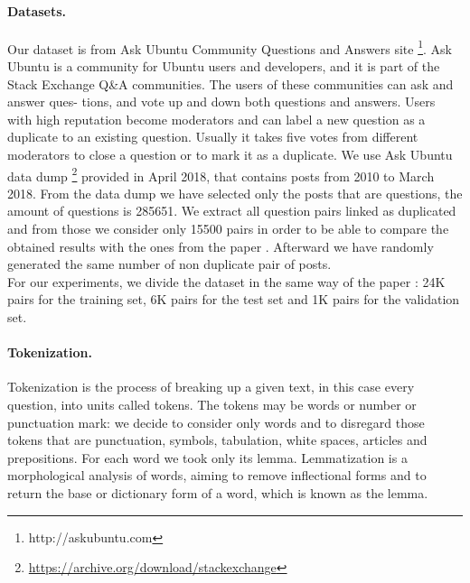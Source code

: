 \documentclass[10pt,twocolumn,letterpaper]{article}
\begin{document}
\paragraph{Datasets.}
Our dataset is from Ask Ubuntu Community Questions and Answers site \footnote{http://askubuntu.com}. Ask Ubuntu is a community for Ubuntu users and developers, and it is part of the Stack Exchange Q\&A communities. The users of these communities can ask and answer ques- tions, and vote up and down both questions and answers. Users with high reputation become moderators and can label a new question as a duplicate to an existing question. Usually it takes five votes from different moderators to close a question or to mark it as a duplicate. 
We use Ask Ubuntu data dump \footnote{ \url{https://archive.org/download/stackexchange}} provided in April 2018, that contains posts from 2010 to March 2018. From the data dump we have selected only the posts that are questions, the amount of questions is 285651. We extract all question pairs linked as duplicated and from those we consider only 15500 pairs in order to be able to compare the obtained results with the ones from the paper \cite{bogdanova2015detecting}. Afterward we have randomly generated the same number of non duplicate pair of posts. \\
For our experiments, we divide the dataset in the same way of the paper \cite{bogdanova2015detecting}: 24K pairs for the training set, 6K pairs for the test set and 1K pairs for the validation set.

\paragraph{Tokenization.}
Tokenization is the process of breaking up a given text, in this case every question, into units called tokens. The tokens may be words or number or punctuation mark: we decide to consider only words and to disregard those tokens that are punctuation, symbols, tabulation, white spaces, articles and prepositions.
For each word we took only its lemma. Lemmatization is a morphological analysis of words, aiming to remove inflectional forms and to return the base or dictionary form of a word, which is known as the lemma.
\end{document}
